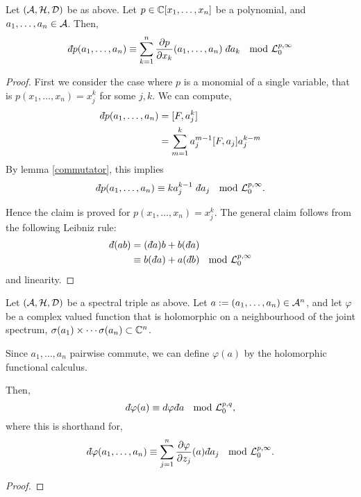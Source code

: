 \begin{lemma}
    Let $(\mathcal{A},\mathcal{H},\mathcal{D})$ be as above. Let $p \in \mathbb{C}[x_1,\ldots,x_n]$ be a polynomial,
    and $a_1,\ldots,a_n \in \mathcal{A}$. 
    Then,
    \begin{equation}
        \qd p(a_1,\ldots,a_n) \equiv \sum_{k=1}^n \frac{\partial p}{\partial x_k}(a_1,\ldots,a_n)\;\qd a_k\; \mod{\mathcal{L}^{p,\infty}_0}
    \end{equation}
\end{lemma}
\begin{proof}
    First we consider the case where $p$ is a monomial of a single variable,
    that is $p(x_1,\ldots,x_n) = x_j^k$ for some $j,k$. We can compute,
    \begin{align}
        \qd p(a_1,\ldots,a_n) &= [F,a_j^k] \\
        &= \sum_{m=1}^{k} a_j^{m-1} [F,a_j] a_j^{k-m}
    \end{align}
    By lemma \ref{commutator}, this implies
    \begin{align}
        \qd p(a_1,\ldots,a_n) \equiv ka_j^{k-1}\; \qd a_j\; \mod{\mathcal{L}^{p,\infty}_0}.
    \end{align}
    
    Hence the claim is proved for $p(x_1,\ldots,x_n) = x_j^k$. The general claim
    follows from the following Leibniz rule:
    \begin{align}
        \qd (ab) &= (\qd a)b + b(\qd a)\\
                 &\equiv b(\qd a) + a(\qd b) \;\mod{\mathcal{L}^{p,\infty}_0}
    \end{align}
    and linearity.
\end{proof}

\begin{proposition}
    Let $(\mathcal{A},\mathcal{H},\mathcal{D})$ be a spectral triple as above. Let $a := (a_1,\ldots,a_n) \in \mathcal{A}^n$,
    and let $\varphi$ be a complex valued function that is holomorphic
    on a neighbourhood of the joint spectrum, $\sigma(a_1)\times \cdots \sigma(a_n) \subset \mathbb{C}^n$.
    
    Since $a_1,\ldots,a_n$ pairwise commute, we can define $\varphi(a)$
    by the holomorphic functional calculus.    
    
    Then,
    \begin{equation*}
        \qd \varphi(a) \equiv d\varphi \qd a \;\mod{\mathcal{L}^{p,q}_0},
    \end{equation*}
    where this is shorthand for,
    \begin{equation*}
        \qd \varphi(a_1,\ldots,a_n) \equiv \sum_{j=1}^n \frac{\partial \varphi}{\partial z_j}(a)\qd a_j \;\mod{\mathcal{L}^{p,\infty}_0}.
    \end{equation*}
\end{proposition}
\begin{proof}
    
\end{proof}


